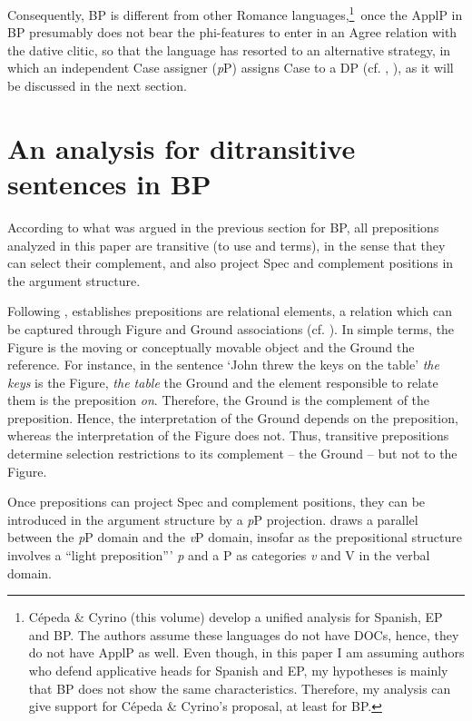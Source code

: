 \documentclass[output=paper,colorlinks,citecolor=brown,nonflat]{./langscibook}
\begin{document}
Consequently, BP is different from other Romance languages,\footnote{Cépeda \& Cyrino (this volume) develop a unified analysis for Spanish, EP and BP. The authors assume these languages do not have DOCs, hence, they do not have ApplP as well. Even though, in this paper I am assuming authors who defend applicative heads for Spanish and EP, my hypotheses is mainly that BP does not show the same characteristics. Therefore, my analysis can give support for Cépeda \& Cyrino’s proposal, at least for BP.}~once the ApplP in BP presumably does not bear the phi-features to enter in an Agree relation with the dative clitic, so that the language has resorted to an alternative strategy, in which an independent Case assigner (\textit{p}P) assigns Case to a DP (cf. \citealt{Calindro2015}, \citeyear{Calindro2016}), as it will be discussed in the next section. 

\section{An analysis for ditransitive sentences in BP}\label{sec:calindro:3}

According to what was argued in the previous section for BP, all prepositions analyzed in this paper are transitive (to use \citealt{Svenonius2004Arguments} and \citealt{Cuervo2010Probus} terms), in the sense that they can select their complement, and also project Spec and complement positions in the argument structure.

Following \citet{HaleKeyser2002}, \citet{Svenonius2004Arguments} establishes prepositions are relational elements, a relation which can be captured through Figure and Ground associations (cf. \citealt{Talmy1978}). In simple terms, the Figure is the moving or conceptually movable object and the Ground the reference. For instance, in the sentence ‘John threw the keys on the table’ \textit{the keys} is the Figure, \textit{the table} the Ground and the element responsible to relate them is the preposition \textit{on}. Therefore, the Ground is the complement of the preposition. Hence, the interpretation of the Ground depends on the preposition, whereas the interpretation of the Figure does not. Thus, transitive prepositions determine selection restrictions to its complement – the Ground – but not to the Figure.

Once prepositions can project Spec and complement positions, they can be introduced in the argument structure by a \textit{p}P projection. \citet[180]{Wood2012} draws a parallel between the \textit{p}P domain and the \textit{v}P domain, insofar as the prepositional structure involves a  ``light preposition''’ \textit{p} and a P as categories \textit{v} and V in the verbal domain.
\end{document}
